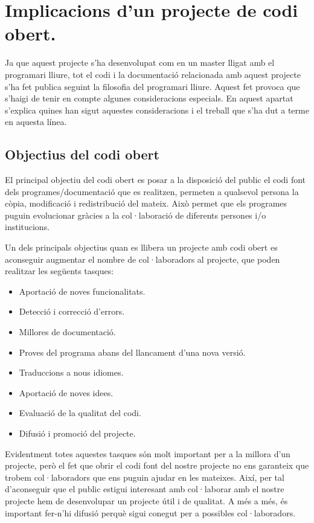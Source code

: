 \chapter{Implicacions d'un projecte de codi obert.}
\label{chap:codi_obert}

Ja que aquest projecte s'ha desenvolupat com en un master lligat amb el programari lliure, tot el codi i la documentació relacionada amb aquest projecte s'ha fet publica seguint la filosofia del programari lliure. Aquest fet provoca que s'haigi de tenir en compte algunes consideracions especials. En aquest apartat s'explica quines han sigut aquestes consideracions i el treball que s'ha dut a terme en aquesta línea. 

\section{Objectius del codi obert}

El principal objectiu del codi obert es posar a la disposició del public el codi font dels programes/documentació que es realitzen, permeten a qualsevol persona la còpia, modificació i redistribució del mateix. Això permet que els programes puguin evolucionar gràcies a la col·laboració de diferents persones i/o institucions.

Un dels principals objectius quan es llibera un projecte amb codi obert es aconseguir augmentar el nombre de col·laboradors al projecte, que poden realitzar les següents tasques:

\begin{itemize}
\item{Aportació de noves funcionalitats.}
\item{Detecció i correcció d'errors.}
\item{Millores de documentació.}
\item{Proves del programa abans del llancament d'una nova versió.}
\item{Traduccions a nous idiomes.}
\item{Aportació de noves idees.}
\item{Evaluació de la qualitat del codi.}
\item{Difusió i promoció del projecte.}
\end{itemize}

Evidentment totes aquestes tasques són molt important per a la millora d'un projecte, però el fet que obrir el codi font del nostre projecte no ens garanteix que trobem col·laboradors que ens puguin ajudar en les mateixes. Així, per tal d'aconseguir que el public estigui interesant amb col·laborar amb el nostre projecte hem de desenvolupar un projecte útil i de qualitat. A més a més, és important fer-n'hi difusió perquè sigui conegut per a possibles col·laboradors.  

